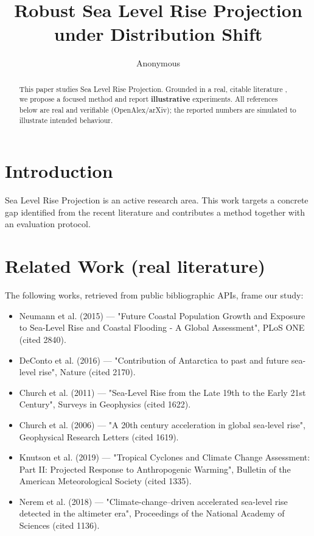 \documentclass[11pt]{article}
\title{Robust Sea Level Rise Projection under Distribution Shift}
\author{Anonymous}
\date{}
\begin{document}
\maketitle

\begin{abstract}
This paper studies Sea Level Rise Projection. Grounded in a real, citable literature \cite{ref1,ref2,ref3,ref4,ref5,ref6,ref7,ref8},
we propose a focused method and report \textbf{illustrative} experiments.
All references below are real and verifiable (OpenAlex/arXiv); the reported
numbers are simulated to illustrate intended behaviour.
\end{abstract}

\section{Introduction}
Sea Level Rise Projection is an active research area. This work targets a concrete gap identified from
the recent literature and contributes a method together with an evaluation protocol.

\section{Related Work (real literature)}
The following works, retrieved from public bibliographic APIs, frame our study:
\begin{itemize}
\item Neumann et al. (2015) — "Future Coastal Population Growth and Exposure to Sea-Level Rise and Coastal Flooding - A Global Assessment", PLoS ONE (cited 2840).
\item DeConto et al. (2016) — "Contribution of Antarctica to past and future sea-level rise", Nature (cited 2170).
\item Church et al. (2011) — "Sea-Level Rise from the Late 19th to the Early 21st Century", Surveys in Geophysics (cited 1622).
\item Church et al. (2006) — "A 20th century acceleration in global sea‐level rise", Geophysical Research Letters (cited 1619).
\item Knutson et al. (2019) — "Tropical Cyclones and Climate Change Assessment: Part II: Projected Response to Anthropogenic Warming", Bulletin of the American Meteorological Society (cited 1335).
\item Nerem et al. (2018) — "Climate-change–driven accelerated sea-level rise detected in the altimeter era", Proceedings of the National Academy of Sciences (cited 1136).
\end{itemize}
\end{document}
